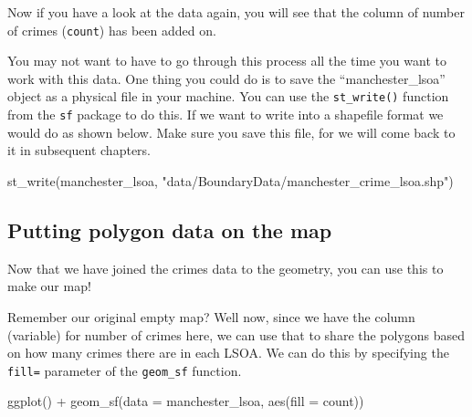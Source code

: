 \documentclass[
]{book}
\newenvironment{Shaded}{\begin{snugshade}}{\end{snugshade}}
\newcommand{\AttributeTok}[1]{\textcolor[rgb]{0.77,0.63,0.00}{#1}}
\newcommand{\FunctionTok}[1]{\textcolor[rgb]{0.00,0.00,0.00}{#1}}
\newcommand{\NormalTok}[1]{#1}
\newcommand{\SpecialCharTok}[1]{\textcolor[rgb]{0.00,0.00,0.00}{#1}}
\newcommand{\StringTok}[1]{\textcolor[rgb]{0.31,0.60,0.02}{#1}}
\begin{document}
Now if you have a look at the data again, you will see that the column of number of crimes (\texttt{count}) has been added on.

You may not want to have to go through this process all the time you want to work with this data. One thing you could do is to save the ``manchester\_lsoa'' object as a physical file in your machine. You can use the \texttt{st\_write()} function from the \texttt{sf} package to do this. If we want to write into a shapefile format we would do as shown below. Make sure you save this file, for we will come back to it in subsequent chapters.

\begin{Shaded}
\begin{Highlighting}[]
\FunctionTok{st\_write}\NormalTok{(manchester\_lsoa, }
         \StringTok{"data/BoundaryData/manchester\_crime\_lsoa.shp"}\NormalTok{)}
\end{Highlighting}
\end{Shaded}

\hypertarget{putting-polygon-data-on-the-map}{%
\subsection{Putting polygon data on the map}\label{putting-polygon-data-on-the-map}}

Now that we have joined the crimes data to the geometry, you can use this to make our map!

Remember our original empty map? Well now, since we have the column (variable) for number of crimes here, we can use that to share the polygons based on how many crimes there are in each LSOA. We can do this by specifying the \texttt{fill=} parameter of the \texttt{geom\_sf} function.

\begin{Shaded}
\begin{Highlighting}[]
\FunctionTok{ggplot}\NormalTok{() }\SpecialCharTok{+} 
\FunctionTok{geom\_sf}\NormalTok{(}\AttributeTok{data =}\NormalTok{ manchester\_lsoa, }\FunctionTok{aes}\NormalTok{(}\AttributeTok{fill =}\NormalTok{ count))}
\end{Highlighting}
\end{Shaded}
\end{document}
